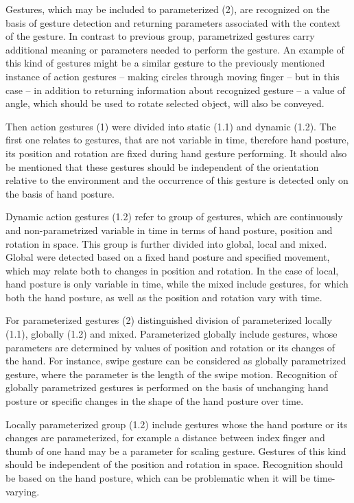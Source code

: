 Gestures, which may be included to parameterized (2), are recognized on the basis of gesture detection and returning parameters associated with the context of the gesture. In contrast to previous group, parametrized gestures carry additional meaning or parameters needed to perform the gesture. An example of this kind of gestures might be a similar gesture to the previously mentioned instance of action gestures -- making circles through moving finger -- but in this case -- in addition to returning information about recognized gesture -- a value of angle, which should be used to rotate selected object, will also be conveyed.

Then action gestures (1) were divided into static (1.1) and dynamic (1.2). The first one relates to gestures, that are not variable in time, therefore hand posture, its position and rotation are fixed during hand gesture performing. It should also be mentioned that these gestures should be independent of the orientation relative to the environment and the occurrence of this gesture is detected only on the basis of hand posture.

Dynamic action gestures (1.2) refer to group of gestures, which are continuously and non-parametrized variable in time in terms of hand posture, position and rotation in space. This group is further divided into global, local and mixed. Global were detected based on a fixed hand posture and specified movement, which may relate both to changes in position and rotation. In the case of local, hand posture is only variable in time, while the mixed include gestures, for which both the hand posture, as well as the position and rotation vary with time. 

For parameterized gestures (2) distinguished division of parameterized locally (1.1), globally (1.2) and mixed. Parameterized globally include gestures, whose parameters are determined by values of position and rotation or its changes of the hand. For instance, swipe gesture can be considered as globally parametrized gesture, where the parameter is the length of the swipe motion. Recognition of globally parametrized gestures is performed on the basis of unchanging hand posture or specific changes in the shape of the hand posture over time.

Locally parameterized group (1.2) include gestures whose the hand posture or its changes are parameterized, for example a distance between index finger and thumb of one hand may be a parameter for scaling gesture. Gestures of this kind should be independent of the position and rotation in space. Recognition should be based on the hand posture, which can be problematic when it will be time-varying.

